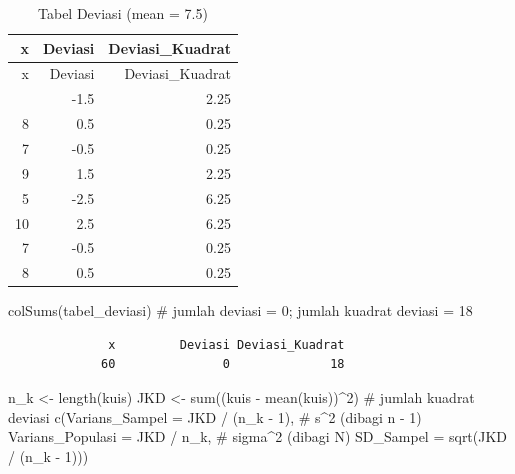 \documentclass[
  indonesian,
  letterpaper,
]{book}
\newenvironment{Shaded}{\begin{snugshade}}{\end{snugshade}}
\newcommand{\AttributeTok}[1]{\textcolor[rgb]{0.40,0.45,0.13}{#1}}
\newcommand{\CommentTok}[1]{\textcolor[rgb]{0.37,0.37,0.37}{#1}}
\newcommand{\DecValTok}[1]{\textcolor[rgb]{0.68,0.00,0.00}{#1}}
\newcommand{\FunctionTok}[1]{\textcolor[rgb]{0.28,0.35,0.67}{#1}}
\newcommand{\NormalTok}[1]{\textcolor[rgb]{0.00,0.23,0.31}{#1}}
\newcommand{\OtherTok}[1]{\textcolor[rgb]{0.00,0.23,0.31}{#1}}
\newcommand{\SpecialCharTok}[1]{\textcolor[rgb]{0.37,0.37,0.37}{#1}}
\begin{document}
\begin{longtable}[]{@{}rrr@{}}
\caption{Tabel Deviasi (mean = 7.5)}\tabularnewline
\toprule\noalign{}
x & Deviasi & Deviasi\_Kuadrat \\
\midrule\noalign{}
\endfirsthead
\toprule\noalign{}
x & Deviasi & Deviasi\_Kuadrat \\
\midrule\noalign{}
\endhead
\bottomrule\noalign{}
\endlastfoot
6 & -1.5 & 2.25 \\
8 & 0.5 & 0.25 \\
7 & -0.5 & 0.25 \\
9 & 1.5 & 2.25 \\
5 & -2.5 & 6.25 \\
10 & 2.5 & 6.25 \\
7 & -0.5 & 0.25 \\
8 & 0.5 & 0.25 \\
\end{longtable}

\begin{Shaded}
\begin{Highlighting}[]
\FunctionTok{colSums}\NormalTok{(tabel\_deviasi)   }\CommentTok{\# jumlah deviasi = 0; jumlah kuadrat deviasi = 18}
\end{Highlighting}
\end{Shaded}

\begin{verbatim}
              x         Deviasi Deviasi_Kuadrat 
             60               0              18 
\end{verbatim}

\begin{Shaded}
\begin{Highlighting}[]
\NormalTok{n\_k }\OtherTok{\textless{}{-}} \FunctionTok{length}\NormalTok{(kuis)}
\NormalTok{JKD }\OtherTok{\textless{}{-}} \FunctionTok{sum}\NormalTok{((kuis }\SpecialCharTok{{-}} \FunctionTok{mean}\NormalTok{(kuis))}\SpecialCharTok{\^{}}\DecValTok{2}\NormalTok{)             }\CommentTok{\# jumlah kuadrat deviasi}
\FunctionTok{c}\NormalTok{(}\AttributeTok{Varians\_Sampel =}\NormalTok{ JKD }\SpecialCharTok{/}\NormalTok{ (n\_k }\SpecialCharTok{{-}} \DecValTok{1}\NormalTok{),           }\CommentTok{\# s\^{}2 (dibagi n {-} 1)}
\AttributeTok{Varians\_Populasi =}\NormalTok{ JKD }\SpecialCharTok{/}\NormalTok{ n\_k,               }\CommentTok{\# sigma\^{}2 (dibagi N)}
\AttributeTok{SD\_Sampel =} \FunctionTok{sqrt}\NormalTok{(JKD }\SpecialCharTok{/}\NormalTok{ (n\_k }\SpecialCharTok{{-}} \DecValTok{1}\NormalTok{)))}
\end{Highlighting}
\end{Shaded}
\end{document}
